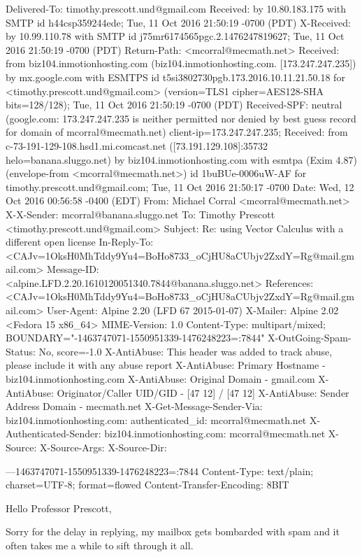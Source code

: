 \begin{itemize}
\begin{itemize}
Delivered-To: timothy.prescott.und@gmail.com
Received: by 10.80.183.175 with SMTP id h44csp359244ede;
        Tue, 11 Oct 2016 21:50:19 -0700 (PDT)
X-Received: by 10.99.110.78 with SMTP id j75mr6174565pgc.2.1476247819627;
        Tue, 11 Oct 2016 21:50:19 -0700 (PDT)
Return-Path: <mcorral@mecmath.net>
Received: from biz104.inmotionhosting.com (biz104.inmotionhosting.com. [173.247.247.235])
        by mx.google.com with ESMTPS id t5si3802730pgb.173.2016.10.11.21.50.18
        for <timothy.prescott.und@gmail.com>
        (version=TLS1 cipher=AES128-SHA bits=128/128);
        Tue, 11 Oct 2016 21:50:19 -0700 (PDT)
Received-SPF: neutral (google.com: 173.247.247.235 is neither permitted nor denied by best guess record for domain of mcorral@mecmath.net) client-ip=173.247.247.235;
Received: from c-73-191-129-108.hsd1.mi.comcast.net ([73.191.129.108]:35732 helo=banana.sluggo.net) by biz104.inmotionhosting.com with esmtpa (Exim 4.87) (envelope-from <mcorral@mecmath.net>) id 1buBUe-0006uW-AF for timothy.prescott.und@gmail.com; Tue, 11 Oct 2016 21:50:17 -0700
Date: Wed, 12 Oct 2016 00:56:58 -0400 (EDT)
From: Michael Corral <mcorral@mecmath.net>
X-X-Sender: mcorral@banana.sluggo.net
To: Timothy Prescott <timothy.prescott.und@gmail.com>
Subject: Re: using Vector Calculus with a different open license
In-Reply-To: <CAJv=1OksH0MhTddy9Yu4=BoHo8733_oCjHU8aCUbjv2ZxdY=Rg@mail.gmail.com>
Message-ID: <alpine.LFD.2.20.1610120051340.7844@banana.sluggo.net>
References: <CAJv=1OksH0MhTddy9Yu4=BoHo8733_oCjHU8aCUbjv2ZxdY=Rg@mail.gmail.com>
User-Agent: Alpine 2.20 (LFD 67 2015-01-07)
X-Mailer: Alpine 2.02 <Fedora 15 x86_64>
MIME-Version: 1.0
Content-Type: multipart/mixed; BOUNDARY="-1463747071-1550951339-1476248223=:7844"
X-OutGoing-Spam-Status: No, score=-1.0
X-AntiAbuse: This header was added to track abuse, please include it with any abuse report
X-AntiAbuse: Primary Hostname - biz104.inmotionhosting.com
X-AntiAbuse: Original Domain - gmail.com
X-AntiAbuse: Originator/Caller UID/GID - [47 12] / [47 12]
X-AntiAbuse: Sender Address Domain - mecmath.net
X-Get-Message-Sender-Via: biz104.inmotionhosting.com: authenticated_id: mcorral@mecmath.net
X-Authenticated-Sender: biz104.inmotionhosting.com: mcorral@mecmath.net
X-Source: 
X-Source-Args: 
X-Source-Dir: 

---1463747071-1550951339-1476248223=:7844
Content-Type: text/plain; charset=UTF-8; format=flowed
Content-Transfer-Encoding: 8BIT

Hello Professor Prescott,

Sorry for the delay in replying, my mailbox gets bombarded with
spam and it often takes me a while to sift through it all.


\end{itemize}
\end{itemize}
